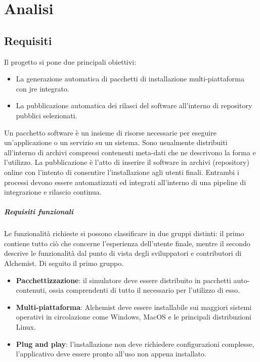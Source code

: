 
\chapter{Analisi}

\section{Requisiti}

Il progetto si pone due principali obiettivi:
\begin{itemize}
	\item La generazione automatica di pacchetti di installazione multi-piattaforma \\ con \ac{jre} integrato.
	\item La pubblicazione automatica dei rilasci del software all'interno di repository pubblici selezionati.
\end{itemize}
Un pacchetto software è un insieme di risorse necessarie per eseguire un'applicazione o un servizio su un sistema. Sono usualmente distribuiti all'interno di archivi compressi contenenti meta-dati che ne descrivono la forma e l'utilizzo. La pubblicazione è l'atto di inserire il software in archivi (repository) online con l'intento di consentire l'installazione agli utenti finali. Entrambi i processi devono essere automatizzati ed integrati all'interno di una pipeline di integrazione e rilascio continua.

\paragraph{Requisiti funzionali}

Le funzionalità richieste si possono classificare in due gruppi distinti: il primo contiene tutto ciò che concerne l'esperienza dell'utente finale, mentre il secondo descrive le funzionalità dal punto di vista degli sviluppatori e contributori di Alchemist. Di seguito il primo gruppo.
\begin{itemize}
	\item \textbf{Pacchettizzazione}: il simulatore deve essere distribuito in pacchetti auto-contenuti, ossia comprendenti di tutto il necessario per l'utilizzo di esso.
	\item \textbf{Multi-piattaforma}: Alchemist deve essere installabile sui maggiori sistemi operativi in circolazione come Windows, MacOS e le principali distribuzioni Linux.
	\item \textbf{Plug and play}: l'installazione non deve richiedere configurazioni complesse, l'applicativo deve essere pronto all'uso non appena installato.
\end{itemize}

